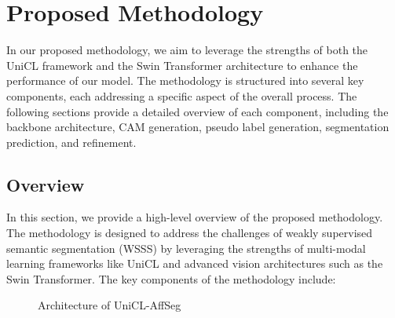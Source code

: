 \chapter{Proposed Methodology}
\label{chap:methodology}

In our proposed methodology, we aim to leverage the strengths of both the UniCL framework and the Swin Transformer architecture to enhance the performance of our model. The methodology is structured into several key components, each addressing a specific aspect of the overall process. The following sections provide a detailed overview of each component, including the backbone architecture, CAM generation, pseudo label generation, segmentation prediction, and refinement.

\section{Overview}
\label{sec:overview}
In this section, we provide a high-level overview of the proposed methodology. The methodology is designed to address the challenges of weakly supervised semantic segmentation (WSSS) by leveraging the strengths of multi-modal learning frameworks like UniCL and advanced vision architectures such as the Swin Transformer. The key components of the methodology include:

\begin{figure}
    \centering
    \caption{Architecture of UniCL-AffSeg}
    \label{fig:architecture}
\end{figure}

